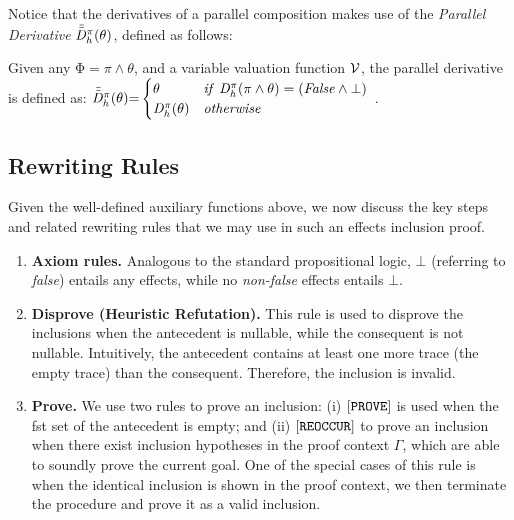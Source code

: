\documentclass[acmsmall,10pt,review]{acmart}
\newcommand{\env}{\code{\mathcal{V}}}
\newcommand{\es}{\theta}
\newcommand{\effect}{{\ensuremath{\mathrm{\Phi}}}}
\newcommand{\code}[1]{{\tt{\ensuremath{\m{#1}}}}}
\newcommand{\codeme}[1]{{\tt{\ensuremath{#1}}}}
\newcommand{\m}{\mathit}
\begin{document}
{Notice that the derivatives of a parallel composition makes use of the \emph{Parallel Derivative} \code{\Bar{\Bar{D}}^{\pi}_{h}(\es)}, defined as follows: 
  \begin{definition}\label{Derivative_maybe}
    Given any \code{\effect {=} \pi \wedge \es}, and a variable valuation function \code{\env}, 
    the parallel derivative is defined as: {
      \code{\Bar{\Bar{D}}^{\pi}_{h}( \es) {=}
      \begin{cases}
            \code{ \es} & \code{if\ D^{\pi}_{h}(\pi \wedge \es) = (False \wedge \bot )}\\
            \code{D^{\pi}_{h}( \es)} & \code{otherwise}
          \end{cases} }
    }.
  \end{definition}


  \vspace{2mm}
\subsection{Rewriting Rules}
\label{InferenceRules}
Given the well-defined auxiliary functions above, we now discuss the key steps and related rewriting rules that we may use in such an effects inclusion proof.  


\begin{enumerate}
\item 
\textbf{Axiom rules.}
\label{Base}
Analogous to  the standard propositional logic, \code{\bot } (referring to \textit{false}) entails any effects, while no \textit{non-false} effects entails \code{\bot }.


\item 
\textbf{Disprove (Heuristic Refutation).}
\label{Refutation}
This rule is used to disprove the inclusions when the antecedent is nullable, while the consequent is not nullable. Intuitively, the antecedent contains at least one more trace (the empty trace) than the consequent. Therefore, the inclusion is invalid. 


\item 
\textbf{Prove.}
\label{Prove}
We use two rules to prove an inclusion: (i) $\codeme{[PROVE]}$ is 
used when the fst set of the antecedent is empty; and 
(ii) $\codeme{[REOCCUR]}$ to prove an inclusion
when there exist inclusion hypotheses 
in the proof context $\m{\Gamma}$, which are able to 
soundly prove the current goal. One of the special cases of 
this rule is when the identical inclusion is shown in the proof 
context, we then terminate the procedure and prove it as a valid 
inclusion. 



\end{enumerate}}
\end{document}
